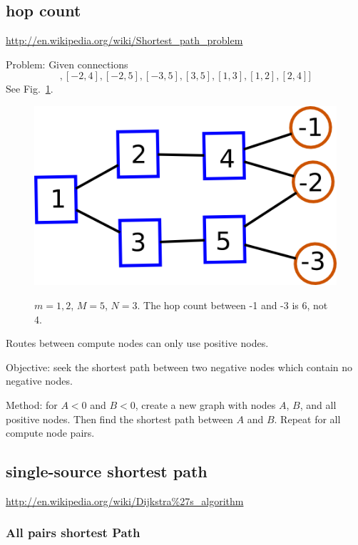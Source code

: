 \documentclass[pdftex]{article}
\begin{document}
\subsection{hop count}

\href{http://en.wikipedia.org/wiki/Shortest_path_problem}{http://en.wikipedia.org/wiki/Shortest\_path\_problem}

Problem: Given connections
\begin{equation}
 [[-1,4],[-2,4],[-2,5],[-3,5],[3,5],[1,3],[1,2],[2,4]]
\end{equation}
See Fig.~\ref{fig:wrong_hop_count}.
\begin{figure}
\begin{center}
\includegraphics[scale=.3]{pictures/N3_n2_M5_m2}
\label{fig:wrong_hop_count}
 \caption{$m=1,2$, $M=5$, $N=3$. The hop count between -1 and -3 is 6, not 4.}
\end{center}
\end{figure}
Routes between compute nodes can only use positive nodes.

Objective: seek the shortest path between two negative nodes which contain no negative nodes.

Method: for $A<0$ and $B<0$, create a new graph with nodes $A$, $B$, and all positive nodes. Then find the shortest path between $A$ and $B$. Repeat for all compute node pairs.

\subsection{single-source shortest path}

\href{http://en.wikipedia.org/wiki/Dijkstra\%27s_algorithm}{http://en.wikipedia.org/wiki/Dijkstra\%27s\_algorithm}

\subsubsection{All pairs shortest Path}
\end{document}
